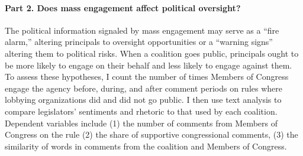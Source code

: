 \paragraph{Part 2. Does mass engagement affect political oversight?} The political information signaled by mass engagement may serve as a ``fire alarm,'' altering principals to oversight opportunities or a ``warning signs'' altering them to political risks.
When a coalition goes public, %
principals ought to be more likely to engage on their behalf and less likely to engage against them.
To assess these hypotheses, I count the number of times Members of Congress engage the agency before, during, and after comment periods on rules where lobbying organizations did and did not go public. I then use text analysis to compare legislators' sentiments and rhetoric to that used by each coalition.
Dependent variables include 
(1) the number of comments from Members of Congress on the rule %
(2) the share of supportive congressional comments, %
(3) the similarity of words in comments from the coalition and Members of Congress. 

